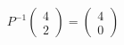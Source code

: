 \documentclass[preview]{standalone}
\begin{document}
\begin{align*}
P^{-1} \begin{pmatrix} 4 \\ 2 \end{pmatrix} = \begin{pmatrix} 4 \\ 0 \end{pmatrix}
\end{align*}
\end{document}
